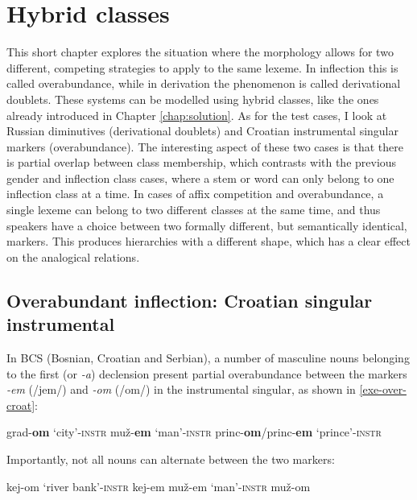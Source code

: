 \chapter{Hybrid classes}\label{chap:hybrid}

This short chapter explores the situation where the morphology allows for two different, competing strategies to apply to the same lexeme. In inflection this is called overabundance, while in derivation the phenomenon is called derivational doublets. These systems can be modelled using hybrid classes, like the ones already introduced in Chapter \ref{chap:solution}. As for the test cases, I look at Russian diminutives (derivational doublets) and Croatian instrumental singular markers (overabundance). The interesting aspect of these two cases is that there is partial overlap between class membership, which contrasts with the previous gender and inflection class cases, where a stem or word can only belong to one inflection class at a time. In cases of affix competition and overabundance, a single lexeme can belong to two different classes at the same time, and thus speakers have a choice between two formally different, but semantically identical, markers. This produces hierarchies with a different shape, which has a clear effect on the analogical relations.

\section{Overabundant inflection: Croatian singular instrumental}


In BCS (Bosnian, Croatian and Serbian), a number of masculine nouns belonging to the first (or \textit{-a}) declension present partial overabundance between the markers \textit{-em} (/jem/) and \textit{-om} (/om/) in the instrumental singular, as shown in \ref{exe-over-croat}:

\begin{exe}
    \ex \label{exe-over-croat}
    \begin{xlist}
        \ex grad-\textbf{om} `city'-\textsc{instr}
        \ex muž-\textbf{em} `man'-\textsc{instr}
        \ex princ-\textbf{om}/princ-\textbf{em} `prince'-\textsc{instr}
    \end{xlist}
\end{exe}

Importantly, not all nouns can alternate between the two markers:

\begin{exe}
    \ex \label{no-over-croat}
    \begin{xlist}
        \ex kej-om `river bank'-\textsc{instr}
        \ex * kej-em
        \ex muž-em `man'-\textsc{instr}
        \ex * muž-om
    \end{xlist}
\end{exe}

